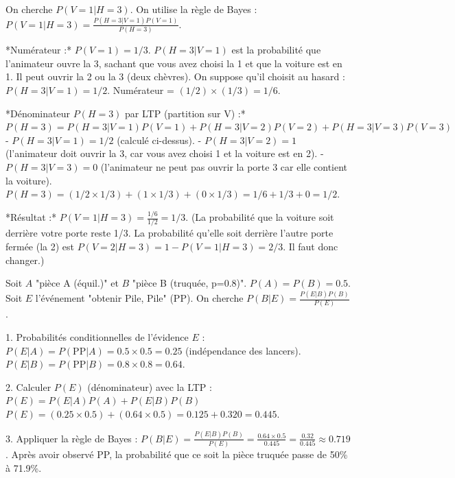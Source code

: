 \begin{correctionbox}
On cherche $P(V=1 | H=3)$. On utilise la règle de Bayes :
$P(V=1 | H=3) = \frac{P(H=3 | V=1) P(V=1)}{P(H=3)}$.

*Numérateur :* $P(V=1) = 1/3$. $P(H=3 | V=1)$ est la probabilité que l'animateur ouvre la 3, sachant que vous avez choisi la 1 et que la voiture est en 1. Il peut ouvrir la 2 ou la 3 (deux chèvres). On suppose qu'il choisit au hasard : $P(H=3 | V=1) = 1/2$.
Numérateur = $(1/2) \times (1/3) = 1/6$.

*Dénominateur $P(H=3)$ par LTP (partition sur V) :*
$P(H=3) = P(H=3|V=1)P(V=1) + P(H=3|V=2)P(V=2) + P(H=3|V=3)P(V=3)$
- $P(H=3|V=1) = 1/2$ (calculé ci-dessus).
- $P(H=3|V=2) = 1$ (l'animateur doit ouvrir la 3, car vous avez choisi 1 et la voiture est en 2).
- $P(H=3|V=3) = 0$ (l'animateur ne peut pas ouvrir la porte 3 car elle contient la voiture).
$P(H=3) = (1/2 \times 1/3) + (1 \times 1/3) + (0 \times 1/3) = 1/6 + 1/3 + 0 = 1/2$.

*Résultat :* $P(V=1 | H=3) = \frac{1/6}{1/2} = 1/3$.
(La probabilité que la voiture soit derrière votre porte reste 1/3. La probabilité qu'elle soit derrière l'autre porte fermée (la 2) est $P(V=2|H=3) = 1 - P(V=1|H=3) = 2/3$. Il faut donc changer.)
\end{correctionbox}

\begin{correctionbox}
Soit $A$ "pièce A (équil.)" et $B$ "pièce B (truquée, p=0.8)". $P(A)=P(B)=0.5$.
Soit $E$ l'événement "obtenir Pile, Pile" (PP).
On cherche $P(B|E) = \frac{P(E|B)P(B)}{P(E)}$.

1.  Probabilités conditionnelles de l'évidence $E$ :
    $P(E|A) = P(\text{PP} | A) = 0.5 \times 0.5 = 0.25$ (indépendance des lancers).
    $P(E|B) = P(\text{PP} | B) = 0.8 \times 0.8 = 0.64$.

2.  Calculer $P(E)$ (dénominateur) avec la LTP :
    $P(E) = P(E|A)P(A) + P(E|B)P(B)$
    $P(E) = (0.25 \times 0.5) + (0.64 \times 0.5) = 0.125 + 0.320 = 0.445$.

3.  Appliquer la règle de Bayes :
    $P(B|E) = \frac{P(E|B)P(B)}{P(E)} = \frac{0.64 \times 0.5}{0.445} = \frac{0.32}{0.445} \approx 0.719$.
    Après avoir observé PP, la probabilité que ce soit la pièce truquée passe de 50\% à 71.9\%.
\end{correctionbox}


